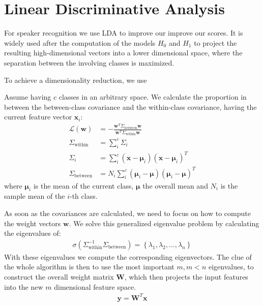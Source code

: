 \section{Linear Discriminative Analysis}

For speaker recognition we use LDA to improve our improve our scores. It is widely used after the computation of the models $H_0$ and $H_1$ to project the resulting high-dimensional vectors into a lower dimensional space, where the separation between the involving classes is maximized.

To achieve a dimensionality reduction, we use

Assume having $c$ classes in an arbitrary space. We calculate the proportion in between the between-class covariance and the within-class covariance, having the current feature vector $\mathbf{x}_i$:
\begin{align*}
\mathcal{L} ( \mathbf{w} ) &= - \frac{\mathbf{w}^T \Sigma_{\text{between}} \mathbf{w}}{\mathbf{w}^T \Sigma_{\text{within}} \mathbf{w}} \\
\Sigma_{\text{within}} &= \sum_i^c \Sigma_i \\
\Sigma_i &= \sum_i^c \left( \mathbf{x} - \boldsymbol{\mu}_i  \right) \left( \mathbf{x} - \boldsymbol{\mu}_i \right)^T\\
\Sigma_{\text{between}} &= N_i \sum_i^c \left( \boldsymbol{\mu}_i - \boldsymbol{\mu} \right) \left( \boldsymbol{\mu}_i - \boldsymbol{\mu} \right)^T
\end{align*}
where $\boldsymbol{\mu}_i$ is the mean of the current class, $\boldsymbol{\mu}$ the overall mean and $N_i$ is the sample mean of the $i$-th class.

As soon as the covariances are calculated, we need to focus on how to compute the weight vectors $\mathbf{w}$. We solve this generalized eigenvalue problem by calculating the eigenvalues of:
\begin{align*}
\sigma\left( \Sigma_{\text{within}}^{-1}\Sigma_{\text{between}} \right) = \left\lbrace \lambda_1 , \lambda_2 , \ldots,\lambda_n \right\rbrace
\end{align*}
With these eigenvalues we compute the corresponding eigenvectors. 
The clue of the whole algorithm is then to use the most important $m, m< n$ eigenvalues, to construct the overall weight matrix $\boldsymbol{W}$, which then projects the input features into the new $m$ dimensional feature space.
\begin{align*}
\mathbf{y} = \mathbf{W}^T \mathbf{x}
\end{align*}

